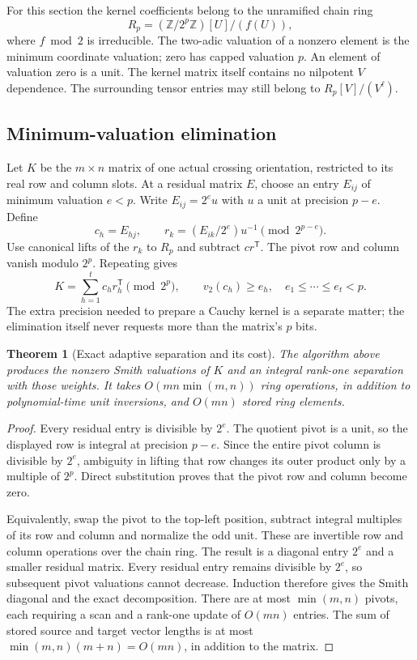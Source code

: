 \documentclass[11pt,letterpaper]{article}
\newtheorem{theorem}{Theorem}[section]
\theoremstyle{definition}\newtheorem{definition}[theorem]{Definition}
\theoremstyle{remark}\newtheorem{remark}[theorem]{Remark}
\newcommand{\vv}{v_2}
\begin{document}
For this section the kernel coefficients belong to the unramified chain
ring
\[
 R_p=(\mathbb Z/2^p\mathbb Z)[U]/(f(U)),
\]
where $f\bmod2$ is irreducible. The two-adic valuation of a nonzero element
is the minimum coordinate valuation; zero has capped valuation $p$.
An element of valuation zero is a unit. The kernel matrix itself contains
no nilpotent $V$ dependence. The surrounding tensor entries may still
belong to $R_p[V]/(V^\ell)$.

\subsection{Minimum-valuation elimination}
Let $K$ be the $m\times n$ matrix of one actual crossing orientation,
restricted to its real row and column slots. At a residual matrix $E$,
choose an entry $E_{ij}$ of minimum valuation $e<p$. Write
$E_{ij}=2^e u$ with $u$ a unit at precision $p-e$. Define
\[
 c_h=E_{hj},\qquad
 r_k=(E_{ik}/2^e)u^{-1}\pmod{2^{p-e}}.
\]
Use canonical lifts of the $r_k$ to $R_p$ and subtract $cr^{\mathsf T}$.
The pivot row and column vanish modulo $2^p$. Repeating gives
\begin{equation}\label{eq:adaptive-separation}
 K=\sum_{h=1}^{t}c_h r_h^{\mathsf T}\pmod{2^p},\qquad
 \vv(c_h)\ge e_h,
 \quad e_1\le\cdots\le e_t<p.
\end{equation}
The extra precision needed to prepare a Cauchy kernel is a separate matter;
the elimination itself never requests more than the matrix's $p$ bits.

\begin{theorem}[Exact adaptive separation and its cost]\label{thm:smith}
The algorithm above produces the nonzero Smith valuations of $K$ and an
integral rank-one separation with those weights. It takes
$O(mn\min(m,n))$ ring operations, in addition to polynomial-time unit
inversions, and $O(mn)$ stored ring elements.
\end{theorem}
\begin{proof}
Every residual entry is divisible by $2^e$. The quotient pivot is a unit,
so the displayed row is integral at precision $p-e$. Since the entire pivot
column is divisible by $2^e$, ambiguity in lifting that row changes its
outer product only by a multiple of $2^p$. Direct substitution proves
that the pivot row and column become zero.

Equivalently, swap the pivot to the top-left position, subtract integral
multiples of its row and column and normalize the odd unit. These are
invertible row and column operations over the chain ring. The result is a
diagonal entry $2^e$ and a smaller residual matrix. Every residual entry
remains divisible by $2^e$, so subsequent pivot valuations cannot decrease.
Induction therefore gives the Smith diagonal and the exact decomposition.
There are at most $\min(m,n)$ pivots, each requiring a scan and a rank-one
update of $O(mn)$ entries. The sum of stored source and target vector
lengths is at most $\min(m,n)(m+n)=O(mn)$, in addition to the matrix.
\end{proof}
\end{document}
